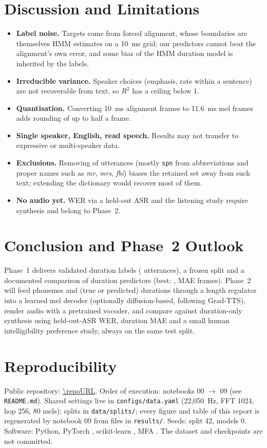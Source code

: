 \documentclass[conference]{IEEEtran}
\begin{document}
\section{Discussion and Limitations}
\begin{itemize}
\item \textbf{Label noise.} Targets come from forced alignment, whose boundaries are themselves HMM estimates on a 10~ms grid; our predictors cannot beat the alignment's own error, and some bias of the HMM duration model is inherited by the labels.
\item \textbf{Irreducible variance.} Speaker choices (emphasis, rate within a sentence) are not recoverable from text, so $R^2$ has a ceiling below 1.
\item \textbf{Quantisation.} Converting 10~ms alignment frames to 11.6~ms mel frames adds rounding of up to half a frame.
\item \textbf{Single speaker, English, read speech.} Results may not transfer to expressive or multi-speaker data.
\item \textbf{Exclusions.} Removing \pctExcluded{} of utterances (mostly \texttt{spn} from abbreviations and proper names such as \emph{mr}, \emph{mrs}, \emph{fbi}) biases the retained set away from such text; extending the dictionary would recover most of them.
\item \textbf{No audio yet.} WER via a held-out ASR and the listening study require synthesis and belong to Phase~2.
\end{itemize}

\section{Conclusion and Phase~2 Outlook}
Phase~1 delivers validated duration labels (\nKept{} utterances), a frozen split and a documented comparison of duration predictors (best: \bestModel, MAE \maeBest{} frames).
Phase~2 will feed phonemes and (true or predicted) durations through a length regulator into a learned mel decoder (optionally diffusion-based, following Grad-TTS), render audio with a pretrained vocoder, and compare against duration-only synthesis using held-out-ASR WER, duration MAE and a small human intelligibility preference study, always on the same test split.

\section{Reproducibility}\label{sec:repro}
Public repository: \url{\repoURL}. Order of execution: notebooks 00 $\rightarrow$ 09 (see \texttt{README.md}). Shared settings live in \texttt{configs/data.yaml} (22{,}050~Hz, FFT 1024, hop 256, 80 mels); splits in \texttt{data/splits/}; every figure and table of this report is regenerated by notebook 09 from files in \texttt{results/}. Seeds: split 42, models 0. Software: Python, PyTorch \cite{paszke2019}, scikit-learn \cite{pedregosa2011}, MFA \mfaVersion. The dataset and checkpoints are not committed.
\end{document}
